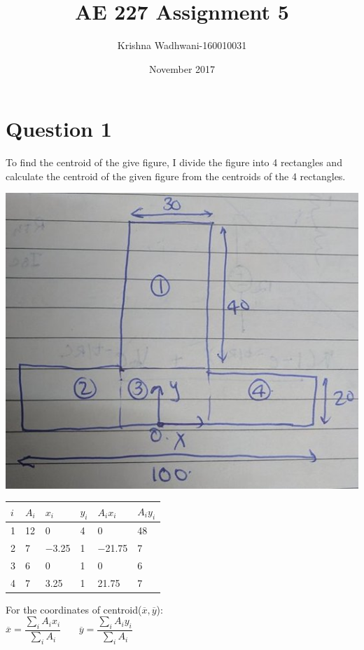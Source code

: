 \documentclass{article}
\title{\Huge AE 227 Assignment 5}
\author{\Huge Krishna Wadhwani-160010031 }
\date{November 2017}
\begin{document}
\maketitle

\section{Question 1}

To find the centroid of the give figure, I divide the figure into 4 rectangles and calculate the centroid of the given figure from the centroids of the 4 rectangles.\\

\begin{center}


\includegraphics[scale=0.25]{Q!.jpg}
\bigbreak
\begin{tabular}{ | m{1cm} | m{1cm}| m{1cm} | m{1cm} | m{1cm}| m{1cm}| } 
\hline
 $i$ & $A_i$ & $x_i$ & $y_i$ & $A_ix_i$ & $A_iy_i$\\ 
\hline
1 & 12 & 0 & 4 & 0 & 48 \\ 
\hline
2 & 7 & $-$3.25 & 1 & $-$21.75 & 7 \\  
\hline
3 & 6 & 0 & 1 & 0 & 6 \\ 
\hline
4 & 7 & 3.25 & 1 & 21.75 & 7 \\ 
\hline
\end{tabular}
\end{center}

\noindent For the coordinates of centroid($\overline{x},\overline{y} $): \\
$\overline{x} =\dfrac{\sum_i A_ix_i}{\sum_i A_i}$ \ \ \ $\overline{y} =\dfrac{\sum_i A_iy_i}{\sum_i A_i}$\\
\end{document}
